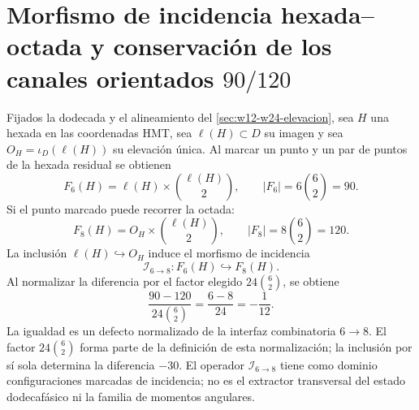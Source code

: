 \section{Morfismo de incidencia hexada--octada y conservación de los canales orientados \(90/120\)}

Fijados la dodecada y el alineamiento del
\cref{sec:w12-w24-elevacion}, sea \(H\) una hexada en las coordenadas HMT,
sea \(\ell(H)\subset D\) su imagen y sea
\(O_H=\iota_D(\ell(H))\) su elevación única. Al marcar un punto
y un par de puntos de la hexada residual se obtienen
\[
F_6(H)=\ell(H)\times\binom{\ell(H)}2,
\qquad
|F_6|=6\binom62=90.
\]
Si el punto marcado puede recorrer la octada:
\[
F_8(H)=O_H\times\binom{\ell(H)}2,
\qquad
|F_8|=8\binom62=120.
\]
La inclusión \(\ell(H)\hookrightarrow O_H\) induce el morfismo de incidencia
\[
 \mathcal I_{6\to8}:F_6(H)\hookrightarrow F_8(H).
\]
Al normalizar la diferencia por el factor
elegido \(24\binom62\), se obtiene
\[
\boxed{
\frac{90-120}{24\binom62}
=\frac{6-8}{24}
=-\frac1{12}.}
\]
La igualdad es un defecto normalizado de la interfaz combinatoria
\(6\to8\). El factor \(24\binom62\) forma parte de la definición de esta
normalización; la inclusión por sí sola determina la diferencia \(-30\).
El operador \(\mathcal I_{6\to8}\) tiene como dominio configuraciones
marcadas de incidencia; no es el extractor transversal del estado
dodecafásico ni la familia de momentos angulares.
